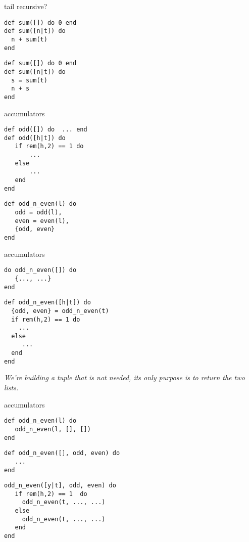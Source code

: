 \begin{frame}[fragile]{tail recursive?}

\begin{verbatim}
def sum([]) do 0 end
def sum([n|t]) do 
  n + sum(t) 
end
\end{verbatim}

\pause
\begin{verbatim}
def sum([]) do 0 end
def sum([n|t]) do 
  s = sum(t)
  n + s
end
\end{verbatim}

\end{frame}

\begin{frame}[fragile]{accumulators}

\begin{verbatim}
def odd([]) do  ... end
def odd([h|t]) do
   if rem(h,2) == 1 do
       ... 
   else 
       ...
   end
end
\end{verbatim}
\pause

\begin{verbatim}
def odd_n_even(l) do
   odd = odd(l),
   even = even(l),
   {odd, even}
end
\end{verbatim}
\end{frame}

\begin{frame}[fragile]{accumulators}

\begin{verbatim}
do odd_n_even([]) do
   {..., ...}
end
\end{verbatim}
\pause
\begin{verbatim}
def odd_n_even([h|t]) do
  {odd, even} = odd_n_even(t)
  if rem(h,2) == 1 do
    ...
  else 
     ...
  end
end
\end{verbatim}

\vspace{40pt}
{\em We're building a tuple that is not needed, its only purpose is to return the two lists.}

\end{frame}


\begin{frame}[fragile]{accumulators}

\pause
\begin{verbatim}
def odd_n_even(l) do 
   odd_n_even(l, [], [])
end
\end{verbatim}

\pause
\begin{verbatim}
def odd_n_even([], odd, even) do
   ...
end
\end{verbatim}
\pause
\begin{verbatim}
odd_n_even([y|t], odd, even) do
   if rem(h,2) == 1  do 
     odd_n_even(t, ..., ...)
   else
     odd_n_even(t, ..., ...) 
   end
end
\end{verbatim}

\end{frame}

